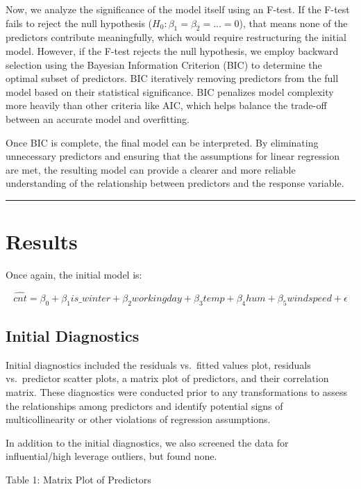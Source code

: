 \documentclass[
  10pt,
]{article}
\begin{document}
Now, we analyze the significance of the model itself using an F-test. If
the F-test fails to reject the null hypothesis
(\(H_0: \beta_1 = \beta_2 = ... = 0\)), that means none of the
predictors contribute meaningfully, which would require restructuring
the initial model. However, if the F-test rejects the null hypothesis,
we employ backward selection using the Bayesian Information Criterion
(BIC) to determine the optimal subset of predictors. BIC iteratively
removing predictors from the full model based on their statistical
significance. BIC penalizes model complexity more heavily than other
criteria like AIC, which helps balance the trade-off between an accurate
model and overfitting.

Once BIC is complete, the final model can be interpreted. By eliminating
unnecessary predictors and ensuring that the assumptions for linear
regression are met, the resulting model can provide a clearer and more
reliable understanding of the relationship between predictors and the
response variable.

\begin{center}\rule{0.5\linewidth}{0.5pt}\end{center}

\section{Results}\label{results}

Once again, the initial model is:

\[
\hat{cnt} = \beta_0 + \beta_1 is\_winter + \beta_2 workingday + \beta_3 temp + \beta_4 hum + \beta_5 windspeed + \epsilon
\]

\subsection{Initial Diagnostics}\label{initial-diagnostics}

Initial diagnostics included the residuals vs.~fitted values plot,
residuals vs.~predictor scatter plots, a matrix plot of predictors, and
their correlation matrix. These diagnostics were conducted prior to any
transformations to assess the relationships among predictors and
identify potential signs of multicollinearity or other violations of
regression assumptions.

In addition to the initial diagnostics, we also screened the data for
influential/high leverage outliers, but found none.

Table 1: Matrix Plot of Predictors
\end{document}
